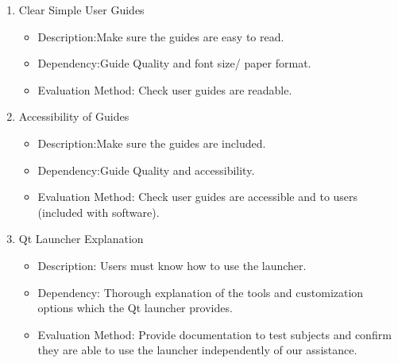 \documentclass[a4paper,10pt]{article}
\begin{document}
	\begin{enumerate}
	  \item Clear Simple User Guides	%
	  \begin{itemize}
	    \item Description:Make sure the guides are easy to read.
	    \item  Dependency:Guide Quality and font size/ paper format.
	    \item Evaluation Method: Check user guides are readable.
	   \end{itemize}
	 \item Accessibility of Guides
	  \begin{itemize}
	    \item Description:Make sure the guides are included. %
	    \item  Dependency:Guide Quality and accessibility.  
	    \item Evaluation Method: Check user guides are accessible and to users (included with software).
	   \end{itemize}
   	 \item Qt Launcher Explanation
   	 \begin{itemize}
	   	 	\item Description: Users must know how to use the launcher.
	   	 	\item  Dependency: Thorough explanation of the tools and customization options which the Qt launcher provides.  
	   	 	\item Evaluation Method: Provide documentation to test subjects and confirm they are able to use the launcher independently of our assistance.
   	 \end{itemize}
	\end{enumerate}

	
	
\pagebreak
\end{document}
